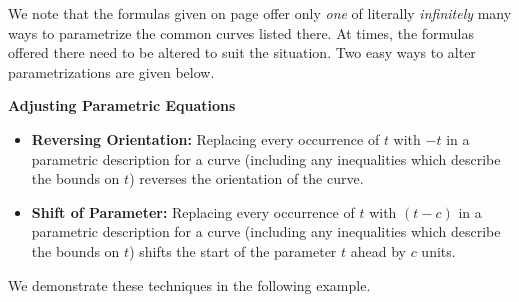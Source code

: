 We note that the formulas given on page \pageref{commonparametrizations} offer only \textit{one} of literally \textit{infinitely} many ways to parametrize the common curves listed there.  At times, the formulas offered there need to be altered to suit the situation.  Two easy ways to alter parametrizations are given below.

\smallskip
\colorbox{ResultColor}{\bbm

\centerline{\textbf{Adjusting Parametric Equations}}

\begin{itemize}

\item  \textbf{Reversing Orientation:}  Replacing every occurrence of $t$ with $-t$ in a parametric description for a curve (including any inequalities which describe the bounds on $t$) reverses the orientation of the curve.  

\item  \textbf{Shift of Parameter:}  Replacing every occurrence of $t$ with $(t-c)$ in a parametric description for a curve (including any inequalities which describe the bounds on $t$) shifts the start of the parameter $t$ ahead by $c$ units.

\end{itemize}

\ebm}

\medskip

We demonstrate these techniques in the following example.

